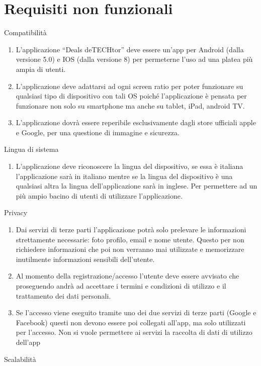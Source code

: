 \documentclass{article}
\begin{document}
\section{Requisiti non funzionali}
Compatibilità
\begin{enumerate}
    \item L’applicazione “Deals deTECHtor” deve essere un’app per Android (dalla versione 5.0) e IOS (dalla versione 8) per permeterne l'uso ad
        una platea più ampia di utenti.
    \item L’applicazione deve adattarsi ad ogni screen ratio per poter funzionare su qualsiasi tipo di dispositivo con tali OS poiché
            l’applicazione è pensata per funzionare non solo su smartphone ma anche su tablet, iPad, android TV.
    \item L’applicazione dovrà essere reperibile esclusivamente dagli store ufficiali apple e Google, per una questione di immagine e sicurezza.
\end{enumerate}
Lingua di sistema
\begin{enumerate}
    \item L’applicazione deve riconoscere la lingua del dispositivo, se essa è italiana l'applicazione sarà in italiano mentre se la lingua del
            dispositivo è una qualsiasi altra la lingua dell'applicazione sarà in inglese. Per permettere ad un più ampio bacino di utenti di utilizzare
            l'applicazione.
\end{enumerate}
Privacy
\begin{enumerate}
    \item Dai servizi di terze parti l’applicazione potrà solo prelevare le informazioni strettamente necessarie: foto profilo, email e nome utente.
            Questo per non richiedere informazioni che poi non verranno mai utilizzate e memorizzare inutilmente informazioni sensibili dell’utente.
    \item Al momento della registrazione/accesso l’utente deve essere avvisato che proseguendo andrà ad accettare i termini e condizioni di utilizzo
            e il trattamento dei dati personali.
    \item Se l’accesso viene eseguito tramite uno dei due servizi di terze parti (Google e Facebook) questi non devono essere poi collegati all’app,
            ma solo utilizzati per l’accesso. Non si vuole permettere ai servizi la raccolta di dati di utilizzo dell’app
\end{enumerate}
Scalabilità
\end{document}
